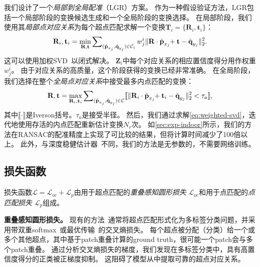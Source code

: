 我们设计了一个\emph{局部到全局配准}（LGR）方案。
作为一种假设验证方法，LGR包括一个局部阶段的变换候选生成和一个全局阶段的变换选择。
在局部阶段，我们使用其\emph{局部点对应关系}为每个超点匹配求解一个变换$\textbf{T}_i = \{\textbf{R}_i, \textbf{t}_i\}$：
\vspace{-2pt}
\begin{equation}
\textbf{R}_i, \textbf{t}_i = \min_{\textbf{R}, \textbf{t}} \sum\nolimits_{(\tilde{\textbf{p}}_{x_j}, \tilde{\textbf{q}}_{y_j}) \in \mathcal{C}_i} w^i_j \lVert \textbf{R} \cdot \tilde{\textbf{p}}_{x_j} \hspace{-3pt} + \textbf{t} - \tilde{\textbf{q}}_{y_j} \rVert_2^2.
\label{eq:weighted-svd}
\vspace{-2pt}
\end{equation}
这可以使用加权SVD~\cite{besl1992method}以闭式解决。
$\textbf{Z}_i$中每个对应关系的相应置信度得分用作权重$w^i_j$。
由于对应关系的高质量，这个阶段获得的变换已经非常准确。
在全局阶段，我们选择在整个\emph{全局点对应关系}中接受最多内点匹配的变换：
\vspace{-2pt}
\begin{equation}
\textbf{R}, \textbf{t} = \max_{\textbf{R}_i, \textbf{t}_i} \sum\nolimits_{(\tilde{\textbf{p}}_{x_j}, \tilde{\textbf{q}}_{y_j}) \in \mathcal{C}} \llbracket \lVert \textbf{R}_i \cdot \tilde{\textbf{p}}_{x_j} \hspace{-3pt} + \textbf{t}_i - \tilde{\textbf{q}}_{y_j} \rVert_2^2 < \tau_a \rrbracket,
\end{equation}
其中$\llbracket \cdot \rrbracket$是Iverson括号。$\tau_a$是接受半径。
然后，我们通过求解\ref{eq:weighted-svd}，迭代地使用存活的内点匹配重新估计变换$N_r$次。
如\ref{sec:exp-indoor}所示，我们的方法在RANSAC的配准精度上实现了可比较的结果，但将计算时间减少了100倍以上。
此外，与深度稳健估计器~\cite{choy2020deep,pais20203dregnet,bai2021pointdsc}不同，我们的方法是无参数的，不需要网络训练。

\subsection{损失函数}
\label{sec:model-loss}

损失函数$\mathcal{L} = \mathcal{L}_{oc} + \mathcal{L}_{p}$由用于超点匹配的\emph{重叠感知圆形损失} $\mathcal{L}_{oc}$和用于点匹配的\emph{点匹配损失} $\mathcal{L}_{p}$组成。

\textbf{重叠感知圆形损失。}
%
现有的方法~\cite{sun2021loftr,yu2021cofinet}通常将超点匹配形式化为多标签分类问题，并采用带双重softmax~\cite{sun2021loftr}或最优传输~\cite{sarlin2020superglue,yu2021cofinet}的交叉熵损失。
每个超点被分配（分类）给一个或多个其他超点，其中基于patch重叠计算的ground truth，很可能一个patch会与多个patch重叠。
通过分析交叉熵损失的梯度，我们发现在多标签分类中，具有高置信度得分的正类被正梯度抑制。
这阻碍了模型从中提取可靠的超点对应关系。

